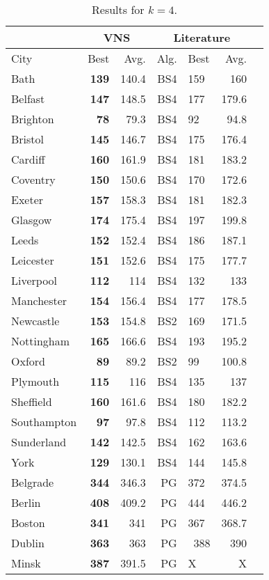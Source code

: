 \documentclass[dvipsnames,format=sigconf,anonymous=true,review=true]{acmart}
\begin{document}
\begin{table}
	\caption{Results for $k=4$.}
	\label{tab:k4}  
	\begin{tabular}{l|rr|rlrr}
		\hline
		\multicolumn{1}{c}{ } & \multicolumn{2}{|c}{VNS} & \multicolumn{3}{|c}{Literature} \\
		\hline
		City & Best & Avg. & Alg. & Best & Avg. \\ \hline
		Bath&\bf{139}&140.4&BS4&159&160\\
		Belfast&\bf{147}&148.5&BS4&177&179.6\\
		Brighton&\bf{78}&79.3&BS4&92&94.8\\
		Bristol&\bf{145}&146.7&BS4&175&176.4\\
		Cardiff&\bf{160}&161.9&BS4&181&183.2\\
		Coventry&\bf{150}&150.6&BS4&170&172.6\\
		Exeter&\bf{157}&158.3&BS4&181&182.3\\
		Glasgow&\bf{174}&175.4&BS4&197&199.8\\
		Leeds&\bf{152}&152.4&BS4&186&187.1\\
		Leicester&\bf{151}&152.6&BS4&175&177.7\\
		Liverpool&\bf{112}&114&BS4&132&133\\
		Manchester&\bf{154}&156.4&BS4&177&178.5\\
		Newcastle&\bf{153}&154.8&BS2&169&171.5\\
		Nottingham&\bf{165}&166.6&BS4&193&195.2\\
		Oxford&\bf{89}&89.2&BS2&99&100.8\\
		Plymouth&\bf{115}&116&BS4&135&137\\
		Sheffield&\bf{160}&161.6&BS4&180&182.2\\
		Southampton&\bf{97}&97.8&BS4&112&113.2\\
		Sunderland&\bf{142}&142.5&BS4&162&163.6\\
		York&\bf{129}&130.1&BS4&144&145.8\\ \hline \hline
		Belgrade&\bf{344}&346.3&PG&372&374.5\\
		Berlin&\bf{408}&409.2&PG&444&446.2\\
		Boston&\bf{341}&341&PG&367&368.7\\
		Dublin&\bf{363}&363&PG&~388&~390\\
		Minsk&\bf{387}&391.5&PG&X&X\\
		\hline
		
	\end{tabular}
\end{table}
\end{document}
